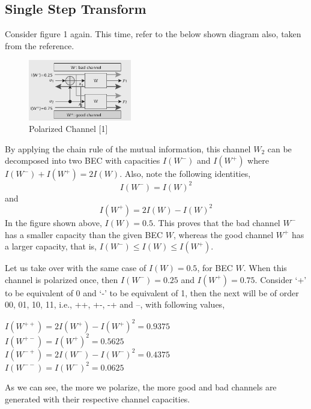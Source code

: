 \documentclass{article}
\begin{document}
\subsection{Single Step Transform}
Consider figure 1 again. This time, refer to the below shown diagram also, taken from the reference. 
\begin{figure}[H]
\centering
\includegraphics[width=0.4\textwidth, height=0.2\textheight]{w2polar.png}
\caption{Polarized Channel [1]}
\end{figure}
By applying the chain rule of the mutual information, this channel $W_{2}$ can be decomposed into two BEC with capacities $I(W^{-})$ and $I(W^{+})$ where $I(W^{-}) + I(W^{+}) = 2I(W)$. Also, note the following identities,
\begin{equation}
I(W^{-}) = I(W)^{2}
\end{equation}
and 
\begin{equation}
I(W^{+}) = 2I(W) - I(W)^{2}
\end{equation}
In the figure shown above, $I(W)=0.5$. This proves that the bad channel $W^{-}$ has a smaller capacity than the given BEC $W$, whereas the good channel $W^{+}$ has a larger capacity, that is, $I(W^{-} ) \leq I(W) \leq I(W^{+})$. 
\par Let us take over with the same case of $I(W)=0.5$, for BEC $W$. When this channel is polarized once, then $I(W^{-}) = 0.25$ and $I(W^{+}) = 0.75$. Consider `+' to be equivalent of 0 and `-' to be equivalent of 1, then the next will be of order 00, 01, 10, 11, i.e., ++, +-, -+ and --, with following values,
\begin{center}
$I(W^{++}) = 2I(W^{+}) - I(W^{+})^{2} = 0.9375$ \\
$I(W^{+-}) = I(W^{+})^{2} = 0.5625$ \\
$I(W^{-+}) = 2I(W^{-}) - I(W^{-})^{2} = 0.4375$ \\
$I(W^{--}) = I(W^{-})^{2} = 0.0625$ 
\end{center}

As we can see, the more we polarize, the more good and bad channels are generated with their respective channel capacities.
\end{document}
